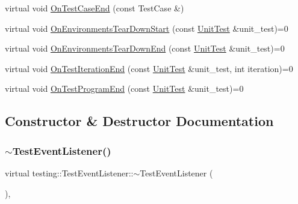 \begin{DoxyCompactItemize}
\item 
virtual void \hyperlink{classtesting_1_1TestEventListener_a6cada1572dde8010b94f6dd237ce52f4}{On\+Test\+Case\+End} (const Test\+Case \&)
\item 
virtual void \hyperlink{classtesting_1_1TestEventListener_a468b5e6701bcb86cb2c956caadbba5e4}{On\+Environments\+Tear\+Down\+Start} (const \hyperlink{classtesting_1_1UnitTest}{Unit\+Test} \&unit\+\_\+test)=0
\item 
virtual void \hyperlink{classtesting_1_1TestEventListener_a9ea04fa7f447865ba76df35e12ba2092}{On\+Environments\+Tear\+Down\+End} (const \hyperlink{classtesting_1_1UnitTest}{Unit\+Test} \&unit\+\_\+test)=0
\item 
virtual void \hyperlink{classtesting_1_1TestEventListener_a550fdb3e55726e4cefa09f5697941425}{On\+Test\+Iteration\+End} (const \hyperlink{classtesting_1_1UnitTest}{Unit\+Test} \&unit\+\_\+test, int iteration)=0
\item 
virtual void \hyperlink{classtesting_1_1TestEventListener_ad15b6246d94c268e233487a86463ef3d}{On\+Test\+Program\+End} (const \hyperlink{classtesting_1_1UnitTest}{Unit\+Test} \&unit\+\_\+test)=0
\end{DoxyCompactItemize}


\subsection{Constructor \& Destructor Documentation}
\mbox{\label{classtesting_1_1TestEventListener_a4512d19e7a108ec4926239ec1ea85d63}} 
\subsubsection{\texorpdfstring{$\sim$\+Test\+Event\+Listener()}{~TestEventListener()}}
{\footnotesize\ttfamily virtual testing\+::\+Test\+Event\+Listener\+::$\sim$\+Test\+Event\+Listener (\begin{DoxyParamCaption}{ }\end{DoxyParamCaption})\hspace{0.3cm}{\ttfamily [inline]}, {\ttfamily [virtual]}}




